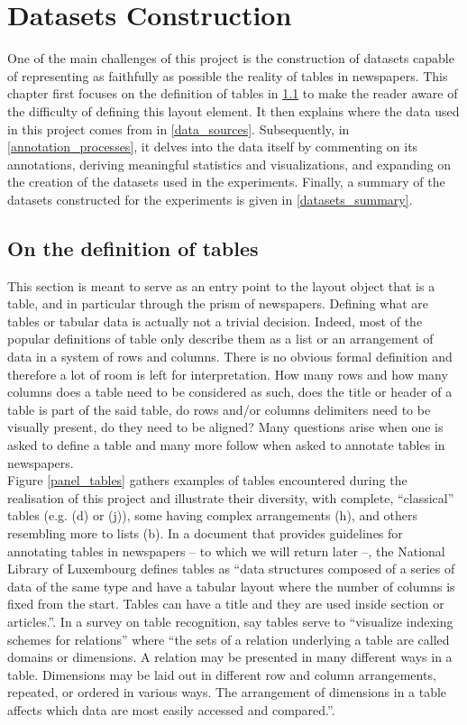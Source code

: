 \chapter{Datasets Construction}
\label{datasets_construction}
One of the main challenges of this project is the construction of datasets capable of representing as faithfully as possible the reality of tables in newspapers. This chapter first focuses on the definition of tables in \ref{on_the_definition_of_tables} to make the reader aware of the difficulty of defining this layout element. It then explains where the data used in this project comes from in \ref{data_sources}. Subsequently, in \ref{annotation_processes}, it delves into the data itself by commenting on its annotations, deriving meaningful statistics and visualizations, and expanding on the creation of the datasets used in the experiments. Finally, a summary of the datasets constructed for the experiments is given in \ref{datasets_summary}.

\section{On the definition of tables}
\label{on_the_definition_of_tables}
This section is meant to serve as an entry point to the layout object that is a table, and in particular through the prism of newspapers. Defining what are tables or tabular data is actually not a trivial decision. Indeed, most of the popular definitions of table only describe them as a list or an arrangement of data in a system of rows and columns. There is no obvious formal definition and therefore a lot of room is left for interpretation. How many rows and how many columns does a table need to be considered as such, does the title or header of a table is part of the said table, do rows and/or columns delimiters need to be visually present, do they need to be aligned? Many questions arise when one is asked to define a table and many more follow when asked to annotate tables in newspapers. \\

Figure \ref{panel_tables} gathers examples of tables encountered during the realisation of this project and illustrate their diversity, with complete, ``classical'' tables (e.g. (d) or (j)), some having complex arrangements (h), and others resembling more to lists (b). In a document that provides guidelines for annotating tables in newspapers -- to which we will return later --, the National Library of Luxembourg defines tables as ``data structures composed of a series of data of the same type and have a tabular layout where the number of columns is fixed from the start. Tables can have a title and they are used inside section or articles.''. In a survey on table recognition, \cite{zanibbi_survey_2004} say tables serve to ``visualize indexing schemes for relations'' where ``the sets of a relation underlying a table are called domains or dimensions. A relation may be presented in many different ways in a table. Dimensions may be laid out in different row and column arrangements, repeated, or ordered in various ways. The arrangement of dimensions in a table affects which data are most easily accessed and compared.''.  \\

